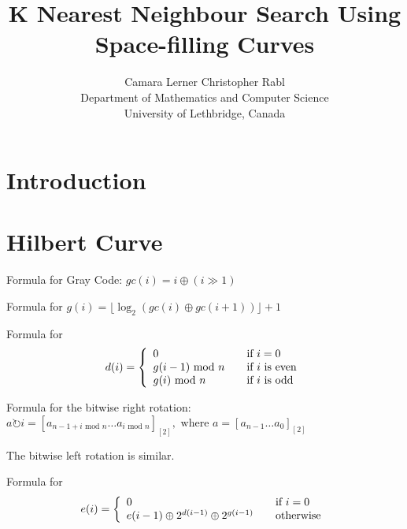 \documentclass[10pt]{article}
\begin{document}
\title{K Nearest Neighbour Search Using Space-filling Curves}
\author{Camara Lerner \hspace{2cm} Christopher Rabl \\
  Department of Mathematics and Computer Science\\
  University of Lethbridge, Canada}

\maketitle

\begin{abstract}

\end{abstract}

\section{Introduction}


\section{Hilbert Curve}


Formula for Gray Code:
$ gc(i) = i \oplus \left( i \gg 1 \right)$ 

Formula for $g(i) = \lfloor \log _{2} \left( gc(i) \oplus gc(i+1) \right) \rfloor + 1$

Formula for
\[ d(i) = \left\{ 
  \begin{array}{l l}
    0 & \quad \text{if $i = 0$}\\
    g(i - 1) \text{ mod } n & \quad \text{if $i$ is even} \\
    g(i) \text{ mod }  n & \quad \text{if $i$ is odd}
  \end{array} \right.\]

Formula for the bitwise right rotation:
$a \rightturn i = \left[ a_{n - 1 + i\text{ mod }n} \ldots a_{i\text{ mod }n} \right]_{\left[ 2 \right]}, \text{ where } a = \left[ a_{n-1} \ldots a_0\right]_{\left[ 2 \right]} $

The bitwise left rotation is similar.

Formula for 
\[ e(i) = \left\{ 
  \begin{array}{l l}
    0 & \quad \text{if $i = 0$}\\
    e(i - 1) \oplus 2^{d(i-1)} \oplus 2^{g(i-1)}& \quad \text{otherwise} \\
  \end{array} \right.\]
\end{document}
